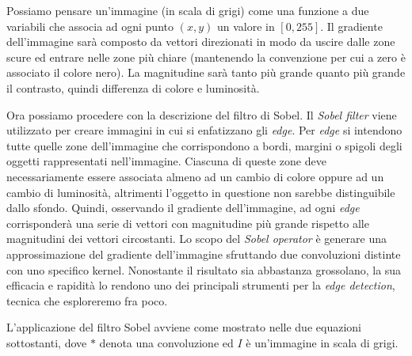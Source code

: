 Possiamo pensare un'immagine (in scala di grigi) come una funzione a due variabili che associa ad ogni punto $(x,y)$ un valore in $[0,255]$.
Il gradiente dell'immagine sarà composto da vettori direzionati in modo da uscire dalle zone scure ed entrare nelle zone più chiare (mantenendo la convenzione per cui a zero è associato il colore nero).
La magnitudine sarà tanto più grande quanto più grande il contrasto, quindi differenza di colore e luminosità.

Ora possiamo procedere con la descrizione del filtro di Sobel.
Il \textit{Sobel filter} viene utilizzato per creare immagini in cui si enfatizzano gli \textit{edge}.
Per \textit{edge} si intendono tutte quelle zone dell'immagine che corrispondono a bordi, margini o spigoli degli oggetti rappresentati nell'immagine.
Ciascuna di queste zone deve necessariamente essere associata almeno ad un cambio di colore oppure ad un cambio di luminosità, altrimenti l'oggetto in questione non sarebbe distinguibile dallo sfondo.
Quindi, osservando il gradiente dell'immagine, ad ogni \textit{edge} corrisponderà una serie di vettori con magnitudine più grande rispetto alle magnitudini dei vettori circostanti.
Lo scopo del \textit{Sobel operator} è generare una approssimazione del gradiente dell'immagine sfruttando due convoluzioni distinte con uno specifico kernel.
Nonostante il risultato sia abbastanza grossolano, la sua efficacia e rapidità lo rendono uno dei principali strumenti per la \textit{edge detection}, tecnica che esploreremo fra poco.

L'applicazione del filtro Sobel avviene come mostrato nelle due equazioni sottostanti, dove $*$ denota una convoluzione ed $I$ è un'immagine in scala di grigi.

